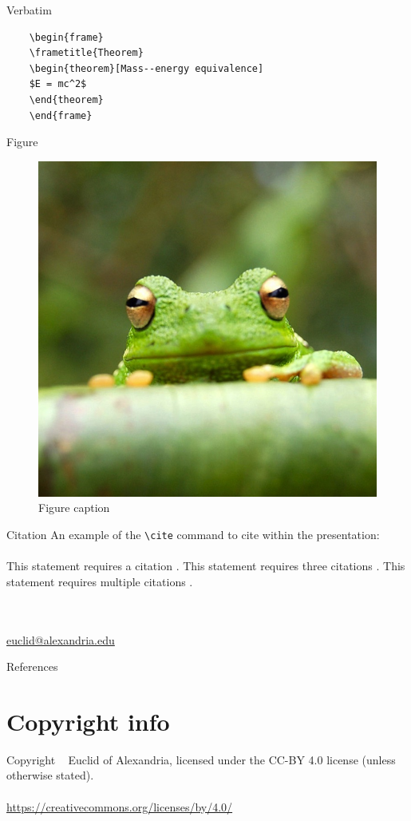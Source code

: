 \documentclass[aspectratio=169]{beamer}
\def \copyrightinfo {Copyright \textcopyright~\the\year{} Euclid of Alexandria, licensed under the CC-BY 4.0 license (unless otherwise stated).}
\def \licenseurl {https://creativecommons.org/licenses/by/4.0/}
\begin{document}
\begin{frame}[fragile]{Verbatim} %
  \begin{example}
    \begin{verbatim}
    \begin{frame}
    \frametitle{Theorem}
    \begin{theorem}[Mass--energy equivalence]
    $E = mc^2$
    \end{theorem}
    \end{frame}\end{verbatim}
  \end{example}
\end{frame}

\begin{frame}{Figure}
  \begin{figure}
    \includegraphics[width=.2\linewidth]{frog}
    \caption{Figure caption}
  \end{figure}
\end{frame}

\begin{frame}[fragile]{Citation} %
  An example of the \verb|\cite| command to cite within the presentation:\\~\\
  This statement requires a citation \cite{westfahl:space}. This statement requires three citations \cite{angenendt,knuth:ct:b,aristotle:rhetoric}. This statement requires multiple citations \cite{angenendt,knuth:ct:b,aristotle:rhetoric,westfahl:space}.
\end{frame}

\begin{frame} %
  \Huge{}\large\\~\\
  \href{mailto:euclid@alexandria.edu}{\ttfamily euclid@alexandria.edu} %
\end{frame}

\appendix 
\begin{frame}[allowframebreaks]{References}
  \nocite{vangennep:related,ctan,aksin,bertram,doody,sigfridsson,spiegelberg,springer,aristotle:poetics,britannica}
  \printbibliography
\end{frame}

\section{Copyright info}
\begin{frame} %
  \copyrightinfo\\~\\
  \url{\licenseurl}\\~\\
\end{frame}
\end{document}
